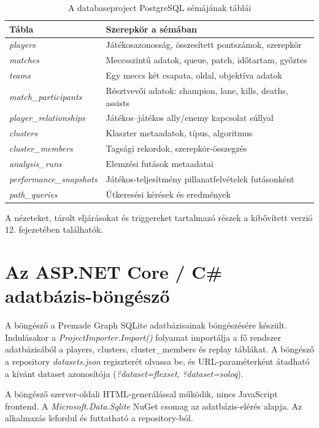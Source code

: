 \begin{table}[H]
\centering
\caption{A databaseproject PostgreSQL sémájának táblái}
\begin{tabularx}{\textwidth}{>{\raggedright\arraybackslash}p{4.5cm}X}
\toprule
\textbf{Tábla} & \textbf{Szerepkör a sémában} \\
\midrule
\textit{players} & Játékosazonosság, összesített pontszámok, szerepkör \\
\textit{matches} & Meccsszintű adatok, queue, patch, időtartam, győztes \\
\textit{teams} & Egy meccs két csapata, oldal, objektíva adatok \\
\textit{match\_participants} & Résztvevői adatok: champion, lane, kills, deaths, assists \\
\textit{player\_relationships} & Játékos--játékos ally/enemy kapcsolat súllyal \\
\textit{clusters} & Klaszter metaadatok, típus, algoritmus \\
\textit{cluster\_members} & Tagsági rekordok, szerepkör-összegzés \\
\textit{analysis\_runs} & Elemzési futások metaadatai \\
\textit{performance\_snapshots} & Játékos-teljesítmény pillanatfelvételek futásonként \\
\textit{path\_queries} & Útkeresési kérések és eredmények \\
\bottomrule
\end{tabularx}
\end{table}

A nézeteket, tárolt eljárásokat és triggereket tartalmazó részek a kibővített verzió 12. fejezetében találhatók.

\section{Az ASP.NET Core / C\# adatbázis-böngésző}

A böngésző a Premade Graph SQLite adatbázisainak böngészésére készült. Indulásakor a \textit{ProjectImporter.Import()} folyamat importálja a fő rendszer adatbázisából a players, clusters, cluster\_members és replay táblákat. A böngésző a repository \textit{datasets.json} regiszterét olvassa be, és URL-paraméterként átadható a kívánt dataset azonosítója (\textit{?dataset=flexset}, \textit{?dataset=soloq}).

A böngésző szerver-oldali HTML-generálással működik, nincs JavaScript frontend. A \textit{Microsoft.Data.Sqlite} NuGet csomag az adatbázis-elérés alapja. Az alkalmazás lefordul és futtatható a repository-ból.

